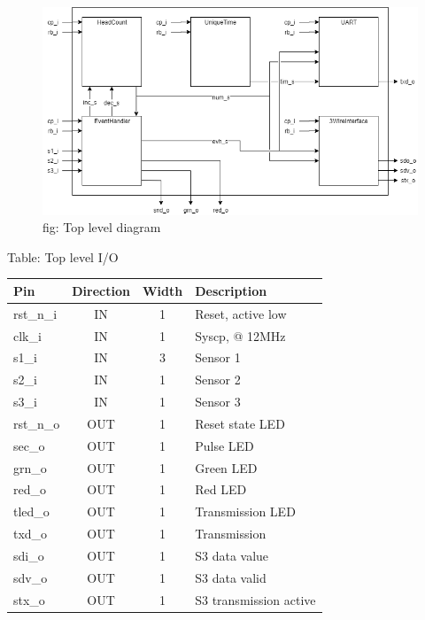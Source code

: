 \documentclass[12pt,a4 paper] {report}
\begin{document}
\begin{figure}[h]
	\centering	
	\includegraphics[scale=0.3]{../png/top.png}
	fig: Top level diagram\\
\end{figure}

\newpage

 Table: Top level I/O \\
\begin{center}
	\begin{tabular}{ | p{2cm} | c | c | p{5cm} |}
		\hline
		\textbf{Pin} & \textbf{Direction} & \textbf{Width} & \textbf{Description} \\
		\hline
		rst\_n\_i & IN & 1 & Reset, active low \\
		\hline
		clk\_i & IN & 1 & Syscp, @ 12MHz \\
		\hline
		s1\_i & IN & 3 & Sensor 1 \\
		\hline
		s2\_i & IN & 1 & Sensor 2 \\
		\hline
		s3\_i & IN & 1 & Sensor 3 \\
		\hline
		rst\_n\_o & OUT & 1 & Reset state LED \\
		\hline
		sec\_o & OUT & 1 & Pulse LED \\
		\hline
		grn\_o & OUT & 1 & Green LED \\
		\hline
		red\_o & OUT & 1 & Red LED\\
		\hline
		tled\_o & OUT & 1 & Transmission LED \\
		\hline
		txd\_o & OUT & 1 & Transmission \\
		\hline
		sdi\_o & OUT & 1 & S3 data value \\
		\hline
		sdv\_o & OUT & 1 & S3 data valid \\
		\hline
		stx\_o & OUT & 1 & S3 transmission active \\
		\hline
	\end{tabular}
\end{center}
\end{document}
